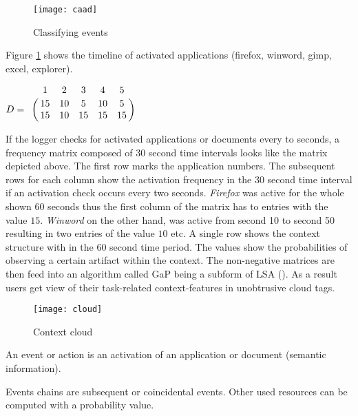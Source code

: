 \begin{figure}[ht]
	\centering
  \texttt{[image: caad]}
	\caption{Classifying events}
	\label{fig12}
\end{figure}

Figure \ref{fig12} shows the timeline of activated applications (firefox, winword, gimp, excel, explorer).

\begin{center}
  \begin{math}
  D=
  \bordermatrix{
  & 1 & 2 & 3 & 4 & 5 \cr
  & 15 & 10 & 5 & 10 & 5\cr
  & 15 & 10 & 15 & 15 & 15}
  \end{math}\\
\end{center}

If the logger checks for activated applications or documents every to seconds, a frequency matrix composed of 30 second time intervals looks like the matrix depicted above. The first row marks the application numbers. The subsequent rows for each column show the activation frequency in the 30 second time interval if an activation check occurs every two seconds. \textit{Firefox} was active for the whole shown 60 seconds thus the first column of the matrix has to entries with the value $15$. \textit{Winword} on the other hand, was active from second 10 to second 50 resulting in two entries of the value $10$ etc. A single row shows the context structure with in the 60 second time period. The values show the probabilities of observing a certain artifact within the context. The non-negative matrices are then feed into an algorithm called \ac{GaP} being a subform of \ac{LSA} (\cite{canny2004gap}). As a result users get view of their task-related context-features in unobtrusive cloud tags.

\begin{figure}[ht]
	\centering
  \texttt{[image: cloud]}
	\caption{Context cloud}
	\label{fig13}
\end{figure}


An event or action is an activation of an application or document (semantic information).


Events chains are subsequent or coincidental events. Other used resources can be computed with a probability value.

